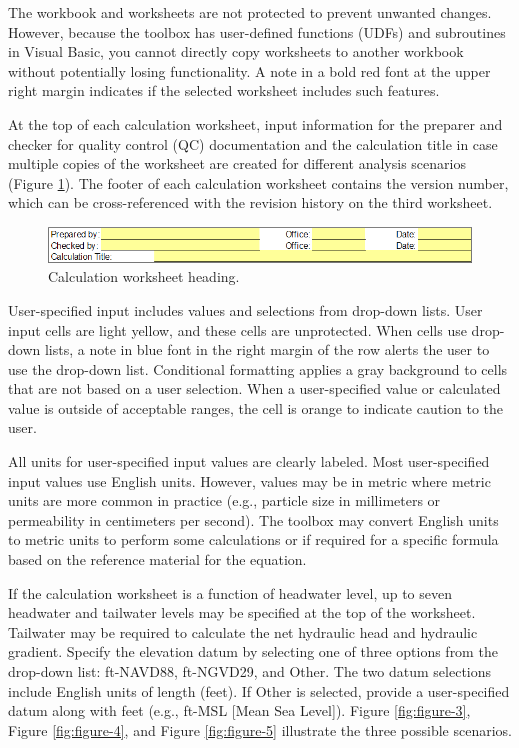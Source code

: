 \documentclass[
]{book}
\begin{document}
The workbook and worksheets are not protected to prevent unwanted changes. However, because the toolbox has user-defined functions (UDFs) and subroutines in Visual Basic, you cannot directly copy worksheets to another workbook without potentially losing functionality. A note in a bold red font at the upper right margin indicates if the selected worksheet includes such features.

At the top of each calculation worksheet, input information for the preparer and checker for quality control (QC) documentation and the calculation title in case multiple copies of the worksheet are created for different analysis scenarios (Figure \ref{fig:figure-2}). The footer of each calculation worksheet contains the version number, which can be cross-referenced with the revision history on the third worksheet.

\begin{figure}

{\centering \includegraphics{images/figure2} 

}

\caption{Calculation worksheet heading.}\label{fig:figure-2}
\end{figure}

User-specified input includes values and selections from drop-down lists. User input cells are light yellow, and these cells are unprotected. When cells use drop-down lists, a note in blue font in the right margin of the row alerts the user to use the drop-down list. Conditional formatting applies a gray background to cells that are not based on a user selection. When a user-specified value or calculated value is outside of acceptable ranges, the cell is orange to indicate caution to the user.

All units for user-specified input values are clearly labeled. Most user-specified input values use English units. However, values may be in metric where metric units are more common in practice (e.g., particle size in millimeters or permeability in centimeters per second). The toolbox may convert English units to metric units to perform some calculations or if required for a specific formula based on the reference material for the equation.

If the calculation worksheet is a function of headwater level, up to seven headwater and tailwater levels may be specified at the top of the worksheet. Tailwater may be required to calculate the net hydraulic head and hydraulic gradient. Specify the elevation datum by selecting one of three options from the drop-down list: ft-NAVD88, ft-NGVD29, and Other. The two datum selections include English units of length (feet). If Other is selected, provide a user-specified datum along with feet (e.g., ft-MSL {[}Mean Sea Level{]}). Figure \ref{fig:figure-3}, Figure \ref{fig:figure-4}, and Figure \ref{fig:figure-5} illustrate the three possible scenarios.
\end{document}
